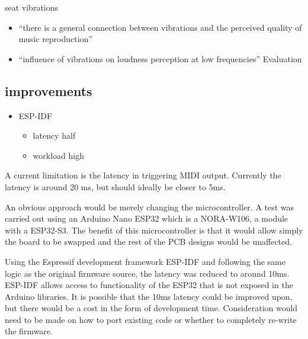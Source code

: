 seat vibrations \cite{MusicalHaptics2018_07}

\begin{itemize}
\item
  ``there is a general connection between vibrations and the perceived
  quality of music reproduction''
\item
  ``influence of vibrations on loudness perception at low frequencies''
  Evaluation
\end{itemize}

\subsection{improvements}\label{improvements}

\begin{itemize}
\item
  ESP-IDF

  \begin{itemize}
  \item
    latency half
  \item
    workload high
  \end{itemize}
\end{itemize}

A current limitation is the latency in triggering MIDI output. Currently
the latency is around 20 ms, but should ideally be closer to 5ms.

An obvious approach would be merely changing the microcontroller. A test
was carried out using an Arduino Nano ESP32 which is a NORA-W106, a
module with a ESP32-S3. The benefit of this microcontroller is that it
would allow simply the board to be swapped and the rest of the PCB
designs would be unaffected.

Using the Espressif development framework ESP-IDF and following the same
logic as the original firmware source, the latency was reduced to around
10ms. ESP-IDF allows access to functionality of the ESP32 that is not
exposed in the Arduino libraries. It is possible that the 10ms latency
could be improved upon, but there would be a cost in the form of
development time. Consideration would need to be made on how to port
existing code or whether to completely re-write the firmware.

